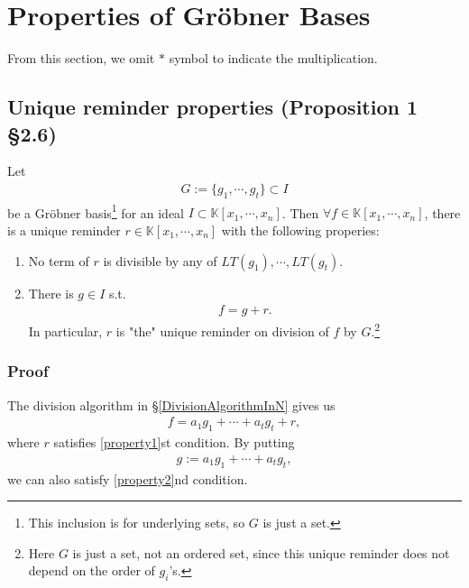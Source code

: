 \documentclass[11pt]{book}
\begin{document}
\section{Properties of Gr\"obner Bases}
From this section, we omit $*$ symbol to indicate the multiplication.

\subsection{Unique reminder properties (Proposition 1 \S2.6)}
\label{UniqueReminderProperties}
Let
\begin{eqnarray}
G := \{g_1, \cdots, g_t\} \subset I
\end{eqnarray}
be a Gr\"obner basis\footnote{This inclusion is for underlying sets, so $G$ is just a set.} for an ideal $I \subset \mathbb{K}[x_1, \cdots, x_n]$.
Then $\forall f \in \mathbb{K}[x_1, \cdots, x_n]$, there is a unique reminder $r \in \mathbb{K}[x_1, \cdots, x_n]$ with the following properies:
\begin{enumerate}
\item 
\label{property1}
No term of $r$ is divisible by any of $LT(g_1), \cdots, LT(g_t)$.

\item 
\label{property2}
There is $g \in I$ s.t.
\begin{eqnarray}
f = g + r.
\end{eqnarray}
In particular, $r$ is "the" unique reminder on division of $f$ by $G$.\footnote{Here $G$ is just a set, not an ordered set, since this unique reminder does not depend on the order of $g_i$'s.}
\end{enumerate}

\subsubsection{Proof}
The division algorithm in \S\ref{DivisionAlgorithmInN} gives us
\begin{eqnarray}
f = a_1 g_1 + \cdots + a_t g_t + r,
\end{eqnarray}
where $r$ satisfies \ref{property1}st condition.
By putting
\begin{eqnarray}
g := a_1 g_1 + \cdots + a_t g_t,
\end{eqnarray}
we can also satisfy \ref{property2}nd condition.
\end{document}
